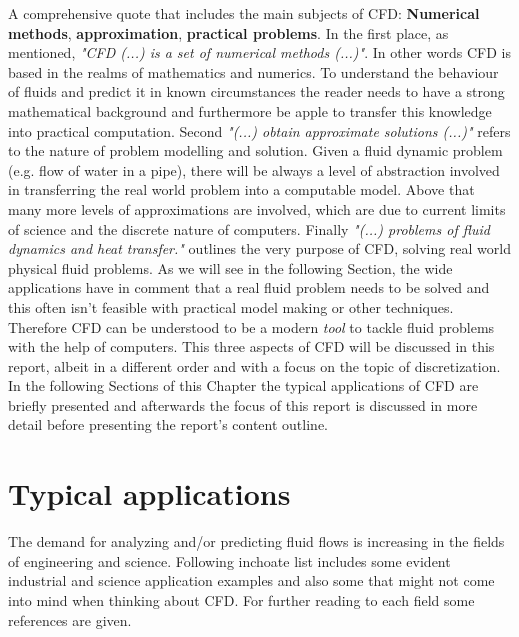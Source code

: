 A comprehensive quote that includes the main subjects of CFD: \textbf{Numerical methods}, \textbf{approximation}, \textbf{practical problems}.  In the first place, as mentioned, \emph{"CFD (...) is a set of numerical methods (...)"}. In other words CFD is based in the realms of mathematics and numerics. To understand the behaviour of fluids and predict it in known circumstances the reader needs to have a strong mathematical background and furthermore be apple to transfer this knowledge into practical computation. Second \emph{"(...) obtain approximate solutions (...)"} refers to the nature of problem modelling and solution. Given a fluid dynamic problem (e.g. flow of water in a pipe), there will be always a level of abstraction involved in transferring the real world problem into a computable model. Above that many more levels of approximations are involved, which are due to current limits of science and the discrete nature of computers. Finally \emph{"(...) problems of fluid dynamics and heat transfer."} outlines the very purpose of CFD, solving real world physical fluid problems. As we will see in the following Section, the wide applications have in comment that a real fluid problem needs to be solved and this often isn't feasible with practical model making or other techniques. Therefore CFD can be understood to be a modern \emph{tool} to tackle fluid problems with the help of computers. This three aspects of CFD will be discussed in this report, albeit in a different order and with a focus on the topic of discretization. In the following Sections of this Chapter the typical applications of CFD are briefly presented and afterwards the focus of this report is discussed in more detail before presenting the report's content outline. 

\section{Typical applications}

The demand for analyzing and/or predicting fluid flows is increasing in the fields of
engineering and science. Following inchoate list includes some evident industrial and science application examples and also some that might not come into mind when thinking about CFD. For further reading to each field some references are given.

